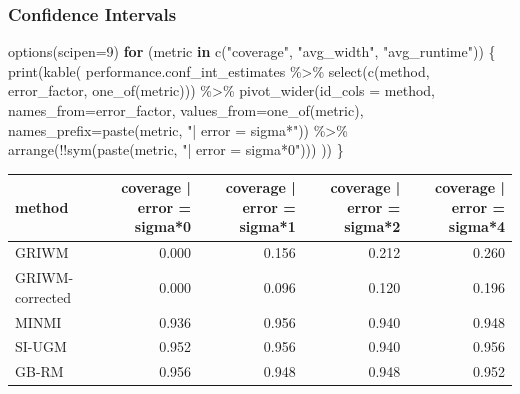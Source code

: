 \documentclass[
]{article}
\newenvironment{Shaded}{\begin{snugshade}}{\end{snugshade}}
\newcommand{\AttributeTok}[1]{\textcolor[rgb]{0.77,0.63,0.00}{#1}}
\newcommand{\ControlFlowTok}[1]{\textcolor[rgb]{0.13,0.29,0.53}{\textbf{#1}}}
\newcommand{\DecValTok}[1]{\textcolor[rgb]{0.00,0.00,0.81}{#1}}
\newcommand{\FunctionTok}[1]{\textcolor[rgb]{0.00,0.00,0.00}{#1}}
\newcommand{\NormalTok}[1]{#1}
\newcommand{\SpecialCharTok}[1]{\textcolor[rgb]{0.00,0.00,0.00}{#1}}
\newcommand{\StringTok}[1]{\textcolor[rgb]{0.31,0.60,0.02}{#1}}
\begin{document}
\hypertarget{confidence-intervals}{%
\subsubsection{Confidence Intervals}\label{confidence-intervals}}

\begin{Shaded}
\begin{Highlighting}[]
\FunctionTok{options}\NormalTok{(}\AttributeTok{scipen=}\DecValTok{9}\NormalTok{)}
\ControlFlowTok{for}\NormalTok{ (metric }\ControlFlowTok{in} \FunctionTok{c}\NormalTok{(}\StringTok{"coverage"}\NormalTok{, }\StringTok{"avg\_width"}\NormalTok{, }\StringTok{"avg\_runtime"}\NormalTok{)) \{}
  \FunctionTok{print}\NormalTok{(}\FunctionTok{kable}\NormalTok{(}
\NormalTok{    performance.conf\_int\_estimates }\SpecialCharTok{\%\textgreater{}\%}
      \FunctionTok{select}\NormalTok{(}\FunctionTok{c}\NormalTok{(method, error\_factor, }\FunctionTok{one\_of}\NormalTok{(metric))) }\SpecialCharTok{\%\textgreater{}\%}
      \FunctionTok{pivot\_wider}\NormalTok{(}\AttributeTok{id\_cols =}\NormalTok{ method,}
                \AttributeTok{names\_from=}\NormalTok{error\_factor,}
                \AttributeTok{values\_from=}\FunctionTok{one\_of}\NormalTok{(metric),}
                \AttributeTok{names\_prefix=}\FunctionTok{paste}\NormalTok{(metric, }\StringTok{"| error = sigma*"}\NormalTok{)) }\SpecialCharTok{\%\textgreater{}\%}
      \FunctionTok{arrange}\NormalTok{(}\SpecialCharTok{!!}\FunctionTok{sym}\NormalTok{(}\FunctionTok{paste}\NormalTok{(metric, }\StringTok{"| error = sigma*0"}\NormalTok{)))}
\NormalTok{  ))}
\NormalTok{\}}
\end{Highlighting}
\end{Shaded}

\begin{tabular}{l|r|r|r|r}
\hline
method & coverage | error = sigma*0 & coverage | error = sigma*1 & coverage | error = sigma*2 & coverage | error = sigma*4\\
\hline
GRIWM & 0.000 & 0.156 & 0.212 & 0.260\\
\hline
GRIWM-corrected & 0.000 & 0.096 & 0.120 & 0.196\\
\hline
MINMI & 0.936 & 0.956 & 0.940 & 0.948\\
\hline
SI-UGM & 0.952 & 0.956 & 0.940 & 0.956\\
\hline
GB-RM & 0.956 & 0.948 & 0.948 & 0.952\\
\hline
\end{tabular}
\end{document}
